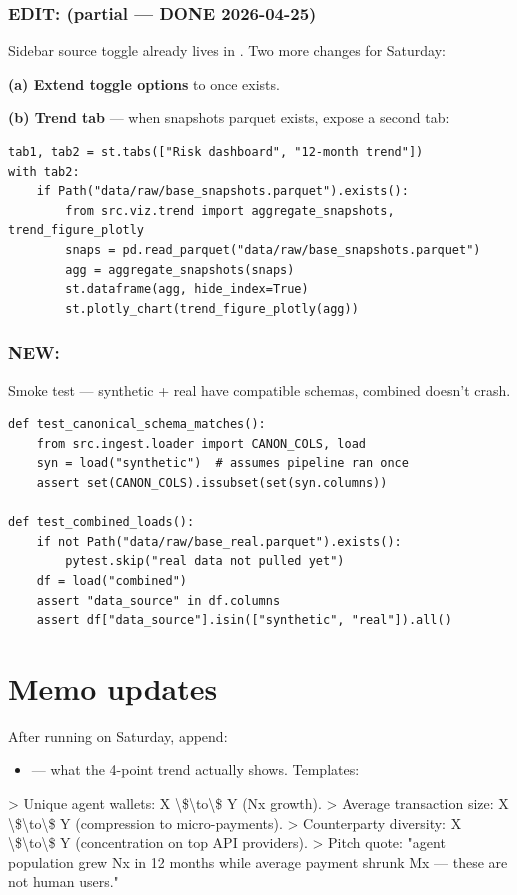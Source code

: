 \documentclass[11pt]{article}
\begin{document}
\subsubsection*{EDIT:  (partial --- DONE 2026-04-25)}
Sidebar source toggle already lives in . Two more changes for Saturday:

\textbf{(a) Extend toggle options} to  once  exists.

\textbf{(b) Trend tab} --- when snapshots parquet exists, expose a second tab:

\begin{lstlisting}
tab1, tab2 = st.tabs(["Risk dashboard", "12-month trend"])
with tab2:
    if Path("data/raw/base_snapshots.parquet").exists():
        from src.viz.trend import aggregate_snapshots, trend_figure_plotly
        snaps = pd.read_parquet("data/raw/base_snapshots.parquet")
        agg = aggregate_snapshots(snaps)
        st.dataframe(agg, hide_index=True)
        st.plotly_chart(trend_figure_plotly(agg))
\end{lstlisting}
\subsubsection*{NEW: }
Smoke test --- synthetic + real have compatible schemas, combined doesn't crash.

\begin{lstlisting}
def test_canonical_schema_matches():
    from src.ingest.loader import CANON_COLS, load
    syn = load("synthetic")  # assumes pipeline ran once
    assert set(CANON_COLS).issubset(set(syn.columns))

def test_combined_loads():
    if not Path("data/raw/base_real.parquet").exists():
        pytest.skip("real data not pulled yet")
    df = load("combined")
    assert "data_source" in df.columns
    assert df["data_source"].isin(["synthetic", "real"]).all()
\end{lstlisting}
\section{Memo updates}
After running on Saturday, append:

\begin{itemize}
  \item \textbf{} --- what the 4-point trend actually shows. Templates:
\end{itemize}
> Unique agent wallets: X \textbackslash{}\$\textbackslash{}to\textbackslash{}\$ Y (Nx growth). > Average transaction size: X \textbackslash{}\$\textbackslash{}to\textbackslash{}\$ Y (compression to micro-payments). > Counterparty diversity: X \textbackslash{}\$\textbackslash{}to\textbackslash{}\$ Y (concentration on top API providers). > Pitch quote: "agent population grew Nx in 12 months while average payment shrunk Mx --- these are not human users."
\end{document}
